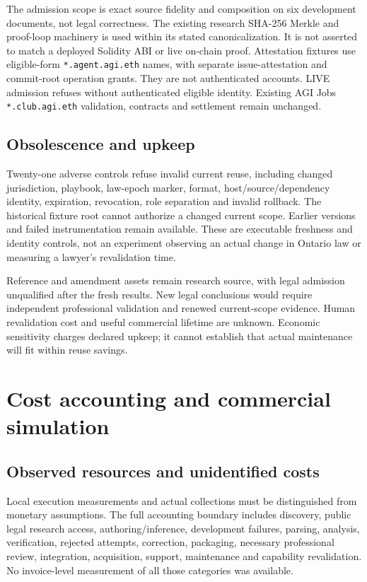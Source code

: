 \documentclass[10pt,a4paper]{article}
\begin{document}
The admission scope is exact source fidelity and composition on six development documents, not legal correctness. The existing research SHA-256 Merkle and proof-loop machinery is used within its stated canonicalization. It is not asserted to match a deployed Solidity ABI or live on-chain proof. Attestation fixtures use eligible-form \texttt{*.agent.agi.eth} names, with separate issue-attestation and commit-root operation grants. They are not authenticated accounts. LIVE admission refuses without authenticated eligible identity. Existing AGI Jobs \texttt{*.club.agi.eth} validation, contracts and settlement remain unchanged.

\subsection{Obsolescence and upkeep}
Twenty-one adverse controls refuse invalid current reuse, including changed jurisdiction, playbook, law-epoch marker, format, host/source/dependency identity, expiration, revocation, role separation and invalid rollback. The historical fixture root cannot authorize a changed current scope. Earlier versions and failed instrumentation remain available. These are executable freshness and identity controls, not an experiment observing an actual change in Ontario law or measuring a lawyer's revalidation time.

Reference and amendment assets remain research source, with legal admission unqualified after the fresh results. New legal conclusions would require independent professional validation and renewed current-scope evidence. Human revalidation cost and useful commercial lifetime are unknown. Economic sensitivity charges declared upkeep; it cannot establish that actual maintenance will fit within reuse savings.

\section{Cost accounting and commercial simulation}
\subsection{Observed resources and unidentified costs}
Local execution measurements and actual collections must be distinguished from monetary assumptions. The full accounting boundary includes discovery, public legal research access, authoring/inference, development failures, parsing, analysis, verification, rejected attempts, correction, packaging, necessary professional review, integration, acquisition, support, maintenance and capability revalidation. No invoice-level measurement of all those categories was available.
\end{document}
